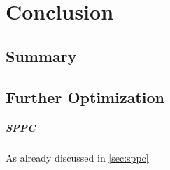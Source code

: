 
\chapter{Conclusion}
\label{chap:conclusion}

\section{Summary}

\section{Further Optimization}

\paragraph{SPPC} As already discussed in \autoref{sec:sppc}